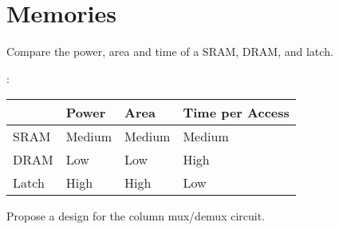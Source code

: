 \section*{Memories}

\begin{ExerciseList}

\Exercise
Compare the power, area and time of a SRAM, DRAM, and latch.

\Answer:\\
\begin{tabular}{||l|p{3cm}|p{3cm}|p{3cm}||}
\hline
\hline
 & Power & Area & Time per Access \\
\hline
SRAM & Medium  & Medium  &  Medium\\
\hline
DRAM & Low & Low & High \\
\hline
Latch & High & High & Low \\
\hline
\hline
\end{tabular}

\Exercise
Propose a design for the column mux/demux circuit.


\end{ExerciseList}
